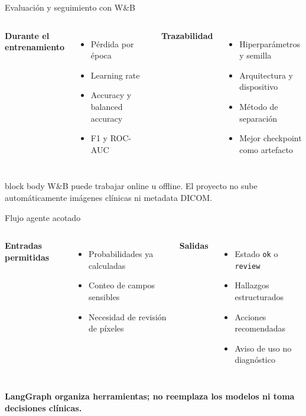 \documentclass[aspectratio=169,10pt]{beamer}
\begin{document}
\begin{frame}{Evaluación y seguimiento con W\&B}
\begin{columns}[T,onlytextwidth]
{\bfseries\color{Navy}Durante el entrenamiento}
\begin{itemize}
  \item Pérdida por época
  \item Learning rate
  \item Accuracy y balanced accuracy
  \item F1 y ROC-AUC
\end{itemize}
{\bfseries\color{Navy}Trazabilidad}
\begin{itemize}
  \item Hiperparámetros y semilla
  \item Arquitectura y dispositivo
  \item Método de separación
  \item Mejor checkpoint como artefacto
\end{itemize}
\end{columns}
\vspace{0.65cm}
\begin{beamercolorbox}[rounded=true,sep=0.35cm]{block body}
W\&B puede trabajar online u offline. El proyecto no sube automáticamente imágenes clínicas ni metadata DICOM.
\end{beamercolorbox}
\end{frame}

\begin{frame}{Flujo agente acotado}
\begin{columns}[T,onlytextwidth]
{\bfseries\color{Navy}Entradas permitidas}
\begin{itemize}
  \item Probabilidades ya calculadas
  \item Conteo de campos sensibles
  \item Necesidad de revisión de píxeles
\end{itemize}
{\bfseries\color{Navy}Salidas}
\begin{itemize}
  \item Estado \texttt{ok} o \texttt{review}
  \item Hallazgos estructurados
  \item Acciones recomendadas
  \item Aviso de uso no diagnóstico
\end{itemize}
\end{columns}
\vspace{0.55cm}
\centering
{\large\color{Blue}\bfseries LangGraph organiza herramientas; no reemplaza los modelos ni toma decisiones clínicas.}
\end{frame}
\end{document}
